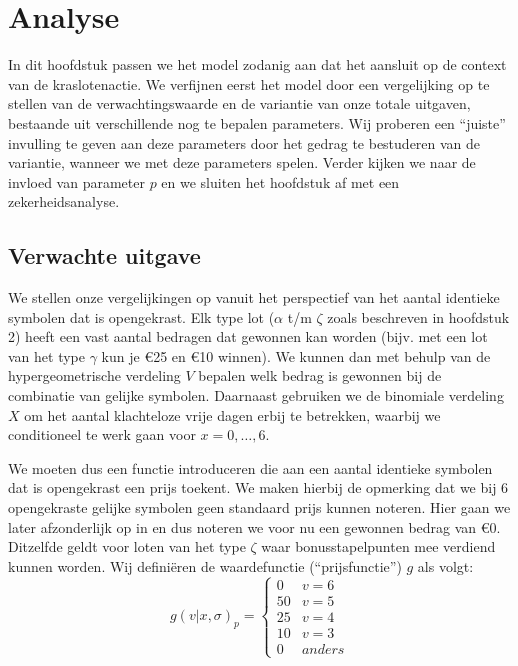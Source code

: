 \chapter{Analyse}\label{cha:analysis}

In dit hoofdstuk passen we het model zodanig aan dat het aansluit op de context van de kraslotenactie. We verfijnen eerst het model door een vergelijking op te stellen van de verwachtingswaarde en de variantie van onze totale uitgaven, bestaande uit verschillende nog te bepalen parameters. Wij proberen een ``juiste'' invulling te geven aan deze parameters door het gedrag te bestuderen van de variantie, wanneer we met deze parameters spelen. Verder kijken we naar de invloed van parameter $p$ en we sluiten het hoofdstuk af met een zekerheidsanalyse.

\section{Verwachte uitgave}

We stellen onze vergelijkingen op vanuit het perspectief van het aantal identieke symbolen dat is opengekrast. Elk type lot ($\alpha$ t/m $\zeta$ zoals beschreven in hoofdstuk 2) heeft een vast aantal bedragen dat gewonnen kan worden (bijv. met een lot van het type $\gamma$ kun je \euro25 en \euro10 winnen). We kunnen dan met behulp van de hypergeometrische verdeling $V$ bepalen welk bedrag is gewonnen bij de combinatie van gelijke symbolen. Daarnaast gebruiken we de binomiale verdeling $X$ om het aantal klachteloze vrije dagen erbij te betrekken, waarbij we conditioneel te werk gaan voor $x=0,\ldots,6$.

We moeten dus een functie introduceren die aan een aantal identieke symbolen dat is opengekrast een prijs toekent. We maken hierbij de opmerking dat we bij 6 opengekraste gelijke symbolen geen standaard prijs kunnen noteren. Hier gaan we later afzonderlijk op in en dus noteren we voor nu een gewonnen bedrag van \euro0. Ditzelfde geldt voor loten van het type $\zeta$ waar bonusstapelpunten mee verdiend kunnen worden. Wij defini\"eren de waardefunctie (``prijsfunctie'') $g$ als volgt:
\begin{equation}
  g(v|x,\sigma)_{p} =
  \begin{cases}
     0 & v = 6\\
    50 & v = 5\\
    25 & v = 4\\
    10 & v = 3\\
    0 & anders
  \end{cases}
\end{equation}

